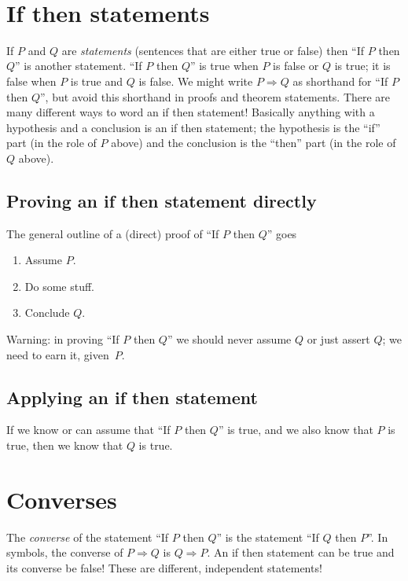 \documentclass[12pt]{amsart}
\begin{document}
	
	\thispagestyle{empty}
	
	\

\section*{If then statements}

If $P$ and $Q$ are \emph{statements} (sentences that are either true or false) then ``If $P$ then $Q$'' is another statement. 
``If $P$ then $Q$'' is true when $P$ is false or $Q$ is true; it is false when $P$ is true and $Q$ is false. We might write $P \Rightarrow Q$ as shorthand for ``If $P$ then $Q$'', but avoid this shorthand in proofs and theorem statements. There are many different ways to word an if then statement! Basically anything with a hypothesis and a conclusion is an if then statement; the hypothesis is the ``if'' part (in the role of $P$ above) and the conclusion is the ``then'' part (in the role of $Q$ above).

\subsection*{Proving an if then statement directly} The general outline of a (direct) proof of ``If $P$ then $Q$'' goes
\begin{enumerate}
\item Assume $P$.
\item Do some stuff.
\item Conclude $Q$.
\end{enumerate}

\noindent Warning: in proving ``If $P$ then $Q$'' we should never assume $Q$ or just assert $Q$; we need to earn it, given~$P$.

\subsection*{Applying an if then statement} If we know or can assume that ``If $P$ then $Q$'' is true, and we also know that $P$ is true, then we know that $Q$ is true. 

\section*{Converses} The \emph{converse} of the statement  ``If $P$ then $Q$'' is the statement  ``If $Q$ then $P$''. In symbols, the converse of $P\Rightarrow Q$ is $Q\Rightarrow P$. An if then statement can be true and its converse be false! These are different, independent statements!
\end{document}
